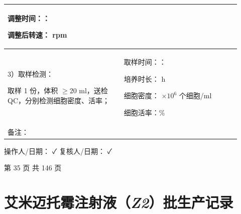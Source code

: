 \documentclass[UTF8,10pt,a4paper,fontset=fandol]{ctexart}
\newcommand{\fieldvalue}[1]{#1}
\newcommand{\handwritten}[1]{#1}
\begin{document}
\begin{center}
\begin{tabular}{|p{0.46\linewidth}|p{0.46\linewidth}|}
\begin{minipage}[t]{0.43\linewidth}
调整时间：\underline{\hspace{0.8cm}}：\underline{\hspace{0.8cm}}

调整后转速：\underline{\hspace{1.1cm}} rpm
\vspace{2pt}
\end{minipage}
\\
\hline
\begin{minipage}[t]{0.43\linewidth}
\vspace{2pt}
3）取样检测：

取样 1 份，体积 $\geq20$ ml，送检 QC，分别检测细胞密度、活率；
\vspace{4pt}
\end{minipage}
&
\begin{minipage}[t]{0.43\linewidth}
\vspace{2pt}
取样时间：\underline{\hspace{0.8cm}}：\underline{\hspace{0.8cm}}

培养时长：\underline{\hspace{1.1cm}} h

细胞密度：\underline{\hspace{0.8cm}} $\times10^{6}$ 个细胞/ml

细胞活率：\underline{\hspace{1.1cm}}\%
\vspace{2pt}
\end{minipage}
\\
\hline
\multicolumn{2}{|l|}{备注：\hspace{0.8\linewidth}}\\
\hline
\end{tabular}
\end{center}

操作人/日期：
\fieldvalue{\handwritten{✓}}
\hfill
复核人/日期：
\fieldvalue{\handwritten{✓}}

\vfill
\begin{center}
\scriptsize 第 35 页 \quad 共 146 页
\end{center}

\newpage

\section*{艾米迈托霉注射液（\textit{Z2}）批生产记录}
\end{document}
